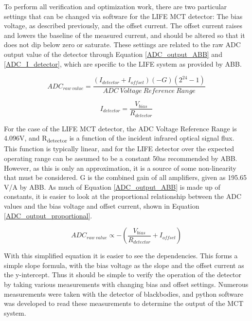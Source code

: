 To perform all verification and optimization work, there are two particular settings that can be changed via software for the LIFE MCT detector: The bias voltage, as described previously, and the offset current. The offset current raises and lowers the baseline of the measured current, and should be altered so that it does not dip below zero or saturate. These settings are related to the raw ADC output value of the detector through Equation \ref{ADC_output_ABB} and \ref{ADC_I_detector}, which are specific to the LIFE system as provided by ABB.

\begin{equation} \label{ADC_output_ABB}
    ADC_{raw\:value} = \frac{(I_{detector} + I_{offset})(-G)(2^{24}-1)}{ADC\:Voltage\:Reference\:Range}
\end{equation}

\begin{equation} \label{ADC_I_detector}
    I_{detector} = \frac{V_{bias}}{R_{detector}}
\end{equation}

For the case of the LIFE MCT detector, the ADC Voltage Reference Range is 4.096V, and R\textsubscript{detector} is a function of the incident infrared optical signal flux. This function is typically linear, and for the LIFE detector over the expected operating range can be assumed to be a constant 50\textOmega as recommended by ABB. However, as this is only an approximation, it is a source of some non-linearity that must be considered. G is the combined gain of all amplifiers, given as 195.65 V/A by ABB. As much of Equation \ref{ADC_output_ABB} is made up of constants, it is easier to look at the proportional relationship between the ADC values and the bias voltage and offset current, shown in Equation \ref{ADC_output_proportional}.

\begin{equation} \label{ADC_output_proportional}
    ADC_{raw\:value} \propto -\left(\frac{V_{bias}}{R_{detector}} + I_{offset}\right)
\end{equation}

With this simplified equation it is easier to see the dependencies. This forms a simple slope formula, with the bias voltage as the slope and the offset current as the y-intercept. Thus it should be simple to verify the operation of the detector by taking various measurements with changing bias and offset settings. Numerous measurements were taken with the detector of blackbodies, and python software was developed to read these measurements to determine the output of the MCT system.

